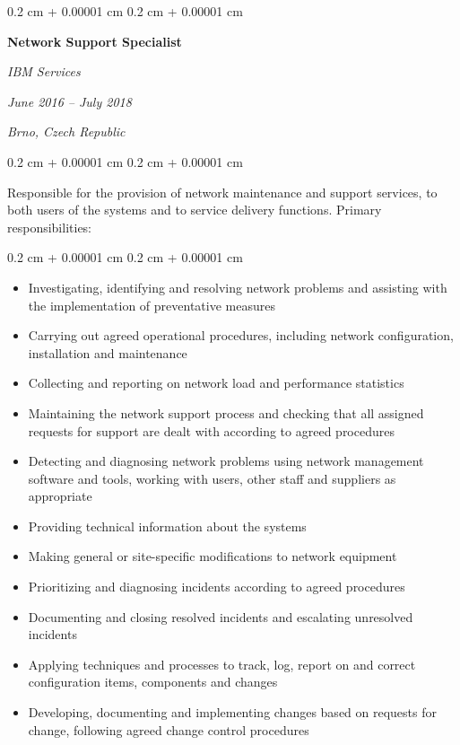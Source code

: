 \documentclass[10pt, a4paper]{article}
\newenvironment{highlights}{
    \begin{itemize}[
        topsep=0.10 cm,
        parsep=0.10 cm,
        partopsep=0pt,
        itemsep=0pt,
        leftmargin=0.4 cm + 10pt
    ]
}{
    \end{itemize}
} %
\newenvironment{onecolentry}{
    \begin{adjustwidth}{
        0.2 cm + 0.00001 cm
    }{
        0.2 cm + 0.00001 cm
    }
}{
    \end{adjustwidth}
} %
\newenvironment{twocolentry}[2][]{
    \onecolentry
    \def\secondColumn{#2}
    \setcolumnwidth{\fill, 4.5 cm}
    \begin{paracol}{2}
}{
    \switchcolumn \raggedleft \secondColumn
    \end{paracol}
    \endonecolentry
} %
\begin{document}
        \vspace{0.2 cm}

        \begin{twocolentry}{
        \textit{June 2016 – July 2018}


        \textit{Brno, Czech Republic}}
            \large\textbf{Network Support Specialist}
            
            \textit{IBM Services}
        \end{twocolentry}

        \vspace{0.10 cm}

        \begin{onecolentry}
        Responsible for the provision of network maintenance and support services, to both users of the systems and to service delivery functions. Primary responsibilities:
        \end{onecolentry}

        \vspace{0.10 cm}

        \begin{onecolentry}
            \begin{highlights}
                \item Investigating, identifying and resolving network problems and assisting with the implementation of preventative measures
                \item Carrying out agreed operational procedures, including network configuration, installation and maintenance
                \item Collecting and reporting on network load and performance statistics
                \item Maintaining the network support process and checking that all assigned requests for support are dealt with according to agreed procedures
                \item Detecting and diagnosing network problems using network management software and tools, working with users, other staff and suppliers as appropriate
                \item Providing technical information about the systems
                \item Making general or site-specific modifications to network equipment
                \item Prioritizing and diagnosing incidents according to agreed procedures
                \item Documenting and closing resolved incidents and escalating unresolved incidents
                \item Applying techniques and processes to track, log, report on and correct configuration items, components and changes
                \item Developing, documenting and implementing changes based on requests for change, following agreed change control procedures
            \end{highlights}
        \end{onecolentry}
\end{document}

